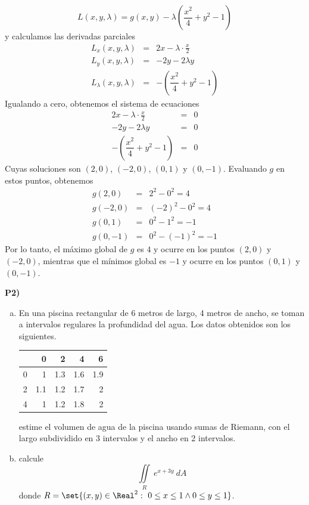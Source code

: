 \documentclass{article}
\begin{document}
\begin{enumerate}[a)]
    $$L(x,y,\lambda) = g(x,y) - \lambda \left(\dfrac{x^2}{4}+y^2-1\right)$$
    y calculamos las derivadas parciales
    \begin{eqnarray*}
      L_x(x,y,\lambda) &=& 2x - \lambda\cdot \frac{x}{2} \\
      L_y(x,y,\lambda) &=& -2y - 2\lambda y \\
      L_\lambda(x,y,\lambda) &=& -\left(\dfrac{x^2}{4}+y^2-1\right)
    \end{eqnarray*}
    Igualando a cero, obtenemos el sistema de ecuaciones
    \begin{eqnarray*}
      2x - \lambda\cdot \frac{x}{2} &=& 0 \\
      -2y - 2\lambda y &=& 0 \\
      -\left(\dfrac{x^2}{4}+y^2-1\right) &=& 0
    \end{eqnarray*}
    Cuyas soluciones son $(2,0)$, $(-2,0)$, $(0,1)$ y $(0,-1)$. Evaluando $g$ en estos puntos, obtenemos
    \begin{eqnarray*}
      g(2,0) &=& 2^2 - 0^2 = 4 \\
      g(-2,0) &=& (-2)^2 - 0^2 = 4 \\
      g(0,1) &=& 0^2 - 1^2 = -1 \\
      g(0,-1) &=& 0^2 - (-1)^2 = -1
    \end{eqnarray*}
    Por lo tanto, el máximo global de $g$ es $4$ y ocurre en los puntos $(2,0)$ y $(-2,0)$, mientras que el mínimos global es $-1$ y ocurre en los puntos $(0,1)$ y $(0,-1)$.
\end{enumerate}


\newpage
\noindent\textbf{P2) }
\begin{enumerate}[a)]
  \item En una piscina rectangular de 6 metros de largo, 4 metros de ancho, se toman a intervalos regulares la profundidad del agua. Los datos obtenidos son los siguientes.
    \begin{center}
    \begin{tabular}{|c||r|r|r|r|}
      \hline
          & 0 &  2 &  4 &  6 \\
      \hline
      \hline
      0   &   1 & 1.3 & 1.6 & 1.9 \\
      \hline
      2   & 1.1 & 1.2 & 1.7 &   2 \\
      \hline
      4   &   1 & 1.2 & 1.8 &   2 \\
      \hline
    \end{tabular}
    \end{center}
    estime el volumen de agua de la piscina usando sumas de Riemann, con el largo subdividido en 3 intervalos y el ancho en 2 intervalos.
  \item calcule
    $$\iint\limits_{R}\ e^{x+3y}\ dA$$
    donde $R=\set{(x,y)\in\Real^2:\ 0\leq x\leq 1 \wedge 0\leq y\leq 1}$.
\end{enumerate}
\end{document}
